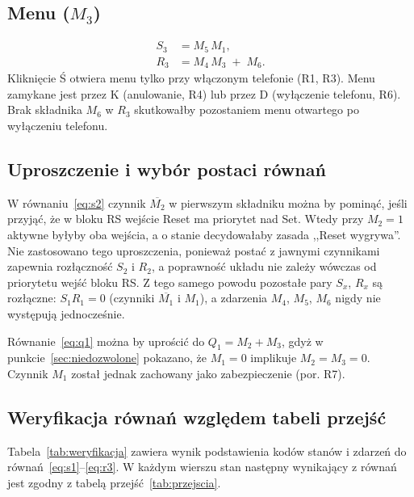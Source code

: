 \subsection{Menu ($M_3$)}
\begin{align}
    S_3 &= M_5\,M_1, \label{eq:s3}\\
    R_3 &= M_4\,M_3 \;+\; M_6. \label{eq:r3}
\end{align}
Kliknięcie Ś otwiera menu tylko przy włączonym telefonie
(R1, R3). Menu zamykane jest przez K (anulowanie, R4) lub przez D
(wyłączenie telefonu, R6). Brak składnika $M_6$ w $R_3$ skutkowałby
pozostaniem menu otwartego po wyłączeniu telefonu.

\subsection{Uproszczenie i wybór postaci równań}
W równaniu~\eqref{eq:s2} czynnik $\overline{M_2}$ w pierwszym
składniku można by pominąć, jeśli przyjąć, że w bloku RS wejście
Reset ma priorytet nad Set. Wtedy przy $M_2=1$ aktywne byłyby oba
wejścia, a o stanie decydowałaby zasada ,,Reset wygrywa''. Nie
zastosowano tego uproszczenia,
ponieważ postać z jawnymi czynnikami zapewnia rozłączność $S_2$
i $R_2$, a poprawność układu nie zależy wówczas od priorytetu wejść
bloku RS. Z tego samego powodu pozostałe pary $S_x$, $R_x$ są
rozłączne: $S_1 R_1 = 0$ (czynniki $\overline{M_1}$ i $M_1$),
a zdarzenia $M_4$, $M_5$, $M_6$ nigdy nie występują jednocześnie.

Równanie~\eqref{eq:q1} można by uprościć do $Q_1 = M_2 + M_3$, gdyż
w punkcie~\ref{sec:niedozwolone} pokazano, że $M_1 = 0$ implikuje
$M_2 = M_3 = 0$. Czynnik $M_1$ został jednak zachowany jako
zabezpieczenie (por. R7).

\subsection{Weryfikacja równań względem tabeli przejść}
Tabela~\ref{tab:weryfikacja} zawiera wynik podstawienia kodów
stanów i zdarzeń do równań~\eqref{eq:s1}--\eqref{eq:r3}. W każdym
wierszu stan następny wynikający z równań jest zgodny z tabelą
przejść~\ref{tab:przejscia}.

